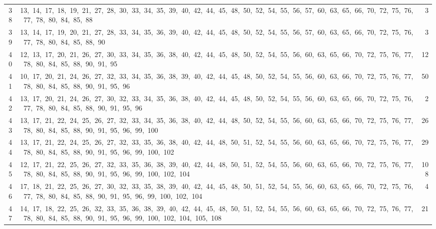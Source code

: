 \begin{longtable}{c|p{}|r}
38 & 13,\ 14,\ 17,\ 18,\ 19,\ 21,\ 27,\ 28,\ 30,\ 33,\ 34,\ 35,\ 39,\ 40,\ 42,\ 44,\ 45,\ 48,\ 50,\ 52,\ 54,\ 55,\ 56,\ 57,\ 60,\ 63,\ 65,\ 66,\ 70,\ 72,\ 75,\ 76,\ 77,\ 78,\ 80,\ 84,\ 85,\ 88 & 3 \\
39 & 13,\ 14,\ 17,\ 19,\ 20,\ 21,\ 27,\ 28,\ 33,\ 34,\ 35,\ 36,\ 39,\ 40,\ 42,\ 44,\ 45,\ 48,\ 50,\ 52,\ 54,\ 55,\ 56,\ 57,\ 60,\ 63,\ 65,\ 66,\ 70,\ 72,\ 75,\ 76,\ 77,\ 78,\ 80,\ 84,\ 85,\ 88,\ 90 & 3 \\
40 & 12,\ 13,\ 17,\ 20,\ 21,\ 26,\ 27,\ 30,\ 33,\ 34,\ 35,\ 36,\ 38,\ 40,\ 42,\ 44,\ 45,\ 48,\ 50,\ 52,\ 54,\ 55,\ 56,\ 60,\ 63,\ 65,\ 66,\ 70,\ 72,\ 75,\ 76,\ 77,\ 78,\ 80,\ 84,\ 85,\ 88,\ 90,\ 91,\ 95 & 12 \\
41 & 10,\ 17,\ 20,\ 21,\ 24,\ 26,\ 27,\ 32,\ 33,\ 34,\ 35,\ 36,\ 38,\ 39,\ 40,\ 42,\ 44,\ 45,\ 48,\ 50,\ 52,\ 54,\ 55,\ 56,\ 60,\ 63,\ 66,\ 70,\ 72,\ 75,\ 76,\ 77,\ 78,\ 80,\ 84,\ 85,\ 88,\ 90,\ 91,\ 95,\ 96 & 50 \\
42 & 13,\ 17,\ 20,\ 21,\ 24,\ 26,\ 27,\ 30,\ 32,\ 33,\ 34,\ 35,\ 36,\ 38,\ 40,\ 42,\ 44,\ 45,\ 48,\ 50,\ 52,\ 54,\ 55,\ 56,\ 60,\ 63,\ 65,\ 66,\ 70,\ 72,\ 75,\ 76,\ 77,\ 78,\ 80,\ 84,\ 85,\ 88,\ 90,\ 91,\ 95,\ 96 & 2 \\
43 & 13,\ 17,\ 21,\ 22,\ 24,\ 25,\ 26,\ 27,\ 32,\ 33,\ 34,\ 35,\ 36,\ 38,\ 40,\ 42,\ 44,\ 48,\ 50,\ 52,\ 54,\ 55,\ 56,\ 60,\ 63,\ 65,\ 66,\ 70,\ 72,\ 75,\ 76,\ 77,\ 78,\ 80,\ 84,\ 85,\ 88,\ 90,\ 91,\ 95,\ 96,\ 99,\ 100 & 26 \\
44 & 13,\ 17,\ 21,\ 22,\ 24,\ 25,\ 26,\ 27,\ 32,\ 33,\ 35,\ 36,\ 38,\ 40,\ 42,\ 44,\ 48,\ 50,\ 51,\ 52,\ 54,\ 55,\ 56,\ 60,\ 63,\ 65,\ 66,\ 70,\ 72,\ 75,\ 76,\ 77,\ 78,\ 80,\ 84,\ 85,\ 88,\ 90,\ 91,\ 95,\ 96,\ 99,\ 100,\ 102 & 29 \\
45 & 12,\ 17,\ 21,\ 22,\ 25,\ 26,\ 27,\ 32,\ 33,\ 35,\ 36,\ 38,\ 39,\ 40,\ 42,\ 44,\ 48,\ 50,\ 51,\ 52,\ 54,\ 55,\ 56,\ 60,\ 63,\ 65,\ 66,\ 70,\ 72,\ 75,\ 76,\ 77,\ 78,\ 80,\ 84,\ 85,\ 88,\ 90,\ 91,\ 95,\ 96,\ 99,\ 100,\ 102,\ 104 & 108 \\
46 & 17,\ 18,\ 21,\ 22,\ 25,\ 26,\ 27,\ 30,\ 32,\ 33,\ 35,\ 38,\ 39,\ 40,\ 42,\ 44,\ 45,\ 48,\ 50,\ 51,\ 52,\ 54,\ 55,\ 56,\ 60,\ 63,\ 65,\ 66,\ 70,\ 72,\ 75,\ 76,\ 77,\ 78,\ 80,\ 84,\ 85,\ 88,\ 90,\ 91,\ 95,\ 96,\ 99,\ 100,\ 102,\ 104 & 4 \\
47 & 14,\ 17,\ 18,\ 22,\ 25,\ 26,\ 32,\ 33,\ 35,\ 36,\ 38,\ 39,\ 40,\ 42,\ 44,\ 45,\ 48,\ 50,\ 51,\ 52,\ 54,\ 55,\ 56,\ 60,\ 63,\ 65,\ 66,\ 70,\ 72,\ 75,\ 76,\ 77,\ 78,\ 80,\ 84,\ 85,\ 88,\ 90,\ 91,\ 95,\ 96,\ 99,\ 100,\ 102,\ 104,\ 105,\ 108 & 21 \\

\end{longtable}
